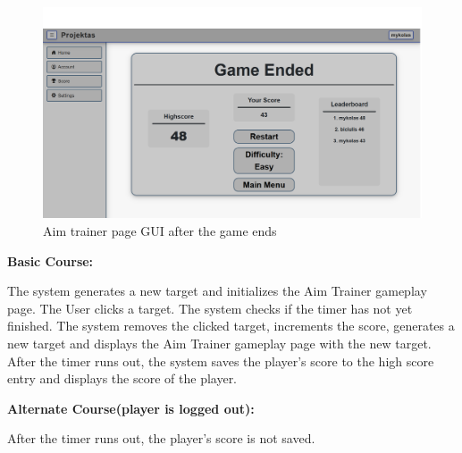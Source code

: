 \documentclass[11pt,a4paper]{article}
\newcommand{\heading}[1]{\vspace{1em}\noindent\textbf{#1}\par\vspace{0.5em}}
\begin{document}
\begin{figure}[H]
    \centering
    \includegraphics[width=1\textwidth,keepaspectratio]{PSI_3rd_trial/PNGs/aim_trainer_3.png}
    \caption{Aim trainer page GUI after the game ends}
    \label{fig:aim_trainer_3}
\end{figure}

\heading{Basic Course:}
The system generates a new target and initializes the Aim Trainer gameplay page. The User clicks a target. The system checks if the timer has not yet finished. The system removes the clicked target, increments the score, generates a new target and displays the Aim Trainer gameplay page with the new target. After the timer runs out, the system saves the player's score to the high score entry and displays the score of the player. 


\heading{Alternate Course(player is logged out):}
After the timer runs out, the player's score is not saved.
\end{document}
